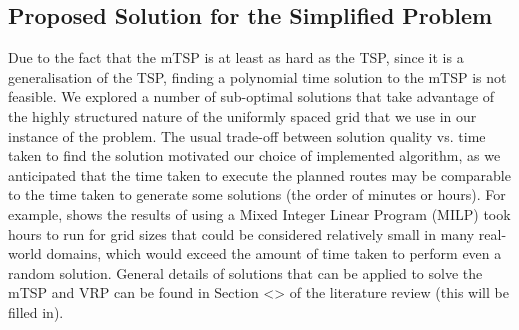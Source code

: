 \subsection{Proposed Solution for the Simplified Problem}
Due to the fact that the mTSP is at least as hard as the TSP, since it is a generalisation of the TSP, finding a polynomial time solution to the mTSP is not feasible. We explored a number of sub-optimal solutions that take advantage of the highly structured nature of the uniformly spaced grid that we use in our instance of the problem. The usual trade-off between solution quality vs. time taken to find the solution motivated our choice of implemented algorithm, as we anticipated that the time taken to execute the planned routes may be comparable to the time taken to generate some solutions (the order of minutes or hours). For example, \cite{Hungerlander2018TheGrids} shows the results of using a Mixed Integer Linear Program (MILP) took hours to run for grid sizes that could be considered relatively small in many real-world domains, which would exceed the amount of time taken to perform even a random solution. General details of solutions that can be applied to solve the mTSP and VRP can be found in Section <> of the literature review (this will be filled in).

